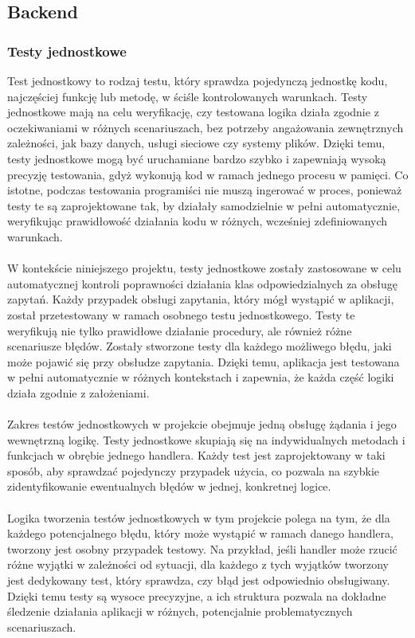 \documentclass[twoside]{projektInzynierskiMS1}
\begin{document}
\newpage

\subsection{Backend}

\subsubsection{Testy jednostkowe}

\noindent
Test jednostkowy to rodzaj testu, który sprawdza pojedynczą jednostkę kodu, najczęściej funkcję lub metodę, w ściśle kontrolowanych warunkach. Testy jednostkowe mają na celu weryfikację, czy testowana logika działa zgodnie z oczekiwaniami w różnych scenariuszach, bez potrzeby angażowania zewnętrznych zależności, jak bazy danych, usługi sieciowe czy systemy plików. Dzięki temu, testy jednostkowe mogą być uruchamiane bardzo szybko i zapewniają wysoką precyzję testowania, gdyż wykonują kod w ramach jednego procesu w pamięci. Co istotne, podczas testowania programiści nie muszą ingerować w proces, ponieważ testy te są zaprojektowane tak, by działały samodzielnie w pełni automatycznie, weryfikując prawidłowość działania kodu w różnych, wcześniej zdefiniowanych warunkach.
\\\\
W kontekście niniejszego projektu, testy jednostkowe zostały zastosowane w celu automatycznej kontroli poprawności działania klas odpowiedzialnych za obsługę zapytań. Każdy przypadek obsługi zapytania, który mógł wystąpić w aplikacji, został przetestowany w ramach osobnego testu jednostkowego. Testy te weryfikują nie tylko prawidłowe działanie procedury, ale również różne scenariusze błędów. Zostały stworzone testy dla każdego możliwego błędu, jaki może pojawić się przy obsłudze zapytania. Dzięki temu, aplikacja jest testowana w pełni automatycznie w różnych kontekstach i zapewnia, że każda część logiki działa zgodnie z założeniami.
\\\\
Zakres testów jednostkowych w projekcie obejmuje jedną obsługę żądania i jego wewnętrzną logikę. Testy jednostkowe skupiają się na indywidualnych metodach i funkcjach w obrębie jednego handlera. Każdy test jest zaprojektowany w taki sposób, aby sprawdzać pojedynczy przypadek użycia, co pozwala na szybkie zidentyfikowanie ewentualnych błędów w jednej, konkretnej logice.
\\\\
Logika tworzenia testów jednostkowych w tym projekcie polega na tym, że dla każdego potencjalnego błędu, który może wystąpić w ramach danego handlera, tworzony jest osobny przypadek testowy. Na przykład, jeśli handler może rzucić różne wyjątki w zależności od sytuacji, dla każdego z tych wyjątków tworzony jest dedykowany test, który sprawdza, czy błąd jest odpowiednio obsługiwany. Dzięki temu testy są wysoce precyzyjne, a ich struktura pozwala na dokładne śledzenie działania aplikacji w różnych, potencjalnie problematycznych scenariuszach. 
\end{document}
